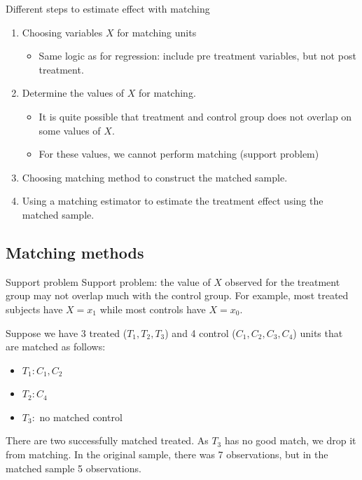 \documentclass[handout]{beamer}
\begin{document}
\begin{frame}{Different steps to estimate effect with matching}
	\begin{enumerate}
		\item Choosing variables $X$ for matching units
		\begin{itemize}
			\item Same logic as for regression: include pre treatment variables, but not post treatment.
		\end{itemize}\bigskip
	
	\item Determine the values of $X$ for matching.
		\begin{itemize}
			\item It is quite possible that treatment and control group does not overlap on some values of $X$.
			\item For these values, we cannot perform matching (support problem)
		\end{itemize}\bigskip
	
	\item Choosing matching method to construct the matched sample.\bigskip
	 
	\item Using a matching estimator to estimate the treatment effect using the matched sample.
	\end{enumerate}
\end{frame}

\subsection{Matching methods}

\begin{frame}{Support problem}
	Support problem: the value of $X$ observed for the treatment group may not overlap much with the control group.	
	For example, most treated subjects have $X=x_1$ while most controls have $X=x_0$.\bigskip
	
	Suppose we have 3 treated ($T_1, T_2, T_3$) and 4 control ($C_1, C_2, C_3, C_4$) units that are matched as follows:
	\begin{itemize}
		\item $T_1: C_1, C_2$
		\item $T_2: C_4$
		\item $T_3:$ no matched control
	\end{itemize}

There are two successfully matched treated. As $T_3$ has no good match, we drop it from matching. In the original sample, there was 7 observations, but in the matched sample 5 observations.
\end{frame}
\end{document}
